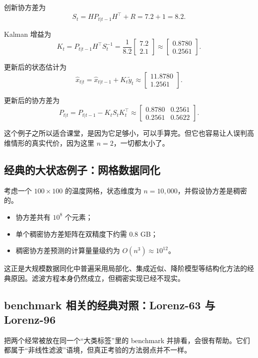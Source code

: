 \documentclass[12pt,a4paper]{ctexart}
\begin{document}
创新协方差为
\[
S_t = H P_{t|t-1} H^\top + R = 7.2 + 1 = 8.2.
\]

Kalman 增益为
\[
K_t
=
P_{t|t-1} H^\top S_t^{-1}
=
\frac{1}{8.2}
\begin{bmatrix}
7.2\\
2.1
\end{bmatrix}
\approx
\begin{bmatrix}
0.8780\\
0.2561
\end{bmatrix}.
\]

更新后的状态估计为
\[
\hat{x}_{t|t}
=
\hat{x}_{t|t-1} + K_t \tilde{y}_t
\approx
\begin{bmatrix}
11.8780\\
1.2561
\end{bmatrix}.
\]

更新后的协方差为
\[
P_{t|t}
=
P_{t|t-1} - K_t S_t K_t^\top
\approx
\begin{bmatrix}
0.8780 & 0.2561\\
0.2561 & 0.5622
\end{bmatrix}.
\]

这个例子之所以适合课堂，是因为它足够小，可以手算完。但它也容易让人误判高维情形的真实代价，因为这里 \(n=2\)，一切都太小了。

\subsection{经典的大状态例子：网格数据同化}\label{app:classic-grid}

考虑一个 \(100 \times 100\) 的温度网格，状态维度为 \(n=10{,}000\)，并假设协方差是稠密的。

\begin{itemize}
  \item 协方差共有 \(10^8\) 个元素；
  \item 单个稠密协方差矩阵在双精度下约需 \(0.8\) GB；
  \item 稠密协方差预测的计算量量级约为 \(O(n^3) \approx 10^{12}\)。
\end{itemize}

这正是大规模数据同化中普遍采用局部化、集成近似、降阶模型等结构化方法的经典原因。滤波方程本身仍然成立，但稠密实现已经不现实。

\subsection{benchmark 相关的经典对照：Lorenz-63 与 Lorenz-96}\label{app:classic-lorenz}

把两个经常被放在同一个“大类标签”里的 benchmark 并排看，会很有帮助。它们都属于“非线性滤波”语境，但真正考验的方法弱点并不一样。
\end{document}
